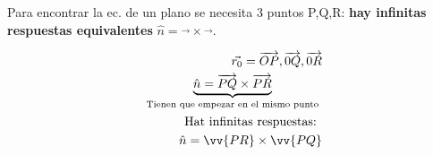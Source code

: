 Para encontrar la ec. de un plano se necesita 3 puntos P,Q,R: \textbf{hay infinitas respuestas equivalentes } $\hat{n}=\vec{}\times \vec{}$.
\begin{center}
    \begin{align*}
        \vec{r_0} = \overrightarrow{OP}, \overrightarrow{0Q}, \overrightarrow{0R} \\ 
        \underbrace{\hat{n} = \overrightarrow{PQ} \times \overrightarrow{PR}}_{\text{  Tienen que empezar en el mismo punto  }} \\ 
        \text{  Hat infinitas respuestas:  } \\ 
        \hat{n} = \vv{PR} \times \vv{PQ} \\ 
    \end{align*}
\end{center}


